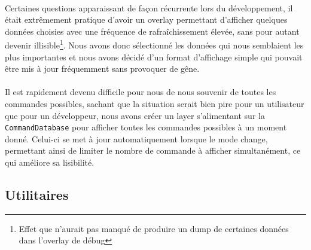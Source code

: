 \paragraph{}
Certaines questions apparaissant de façon récurrente lors du développement,
il était extrêmement pratique d'avoir un overlay permettant d'afficher
quelques données choisies avec une fréquence de rafraîchissement élevée, sans
pour autant devenir illisible\footnote{Effet que n'aurait pas manqué de
produire un dump de certaines données dans l'overlay de débug}. Nous avons
donc sélectionné les données qui nous semblaient les plus importantes et
nous avons décidé d'un format d'affichage simple qui pouvait être mis à jour
fréquemment sans provoquer de gêne.

\paragraph{}
Il est rapidement devenu difficile pour nous de nous souvenir de toutes les
commandes possibles, sachant que la situation serait bien pire pour un
utilisateur que pour un développeur, nous avons créer un layer s'alimentant
sur la \verb!CommandDatabase! pour afficher toutes les commandes possibles
à un moment donné. Celui-ci se met à jour automatiquement lorsque le mode
change, permettant ainsi de limiter le nombre de commande à afficher
simultanément, ce qui améliore sa lisibilité.


\subsection{Utilitaires}
